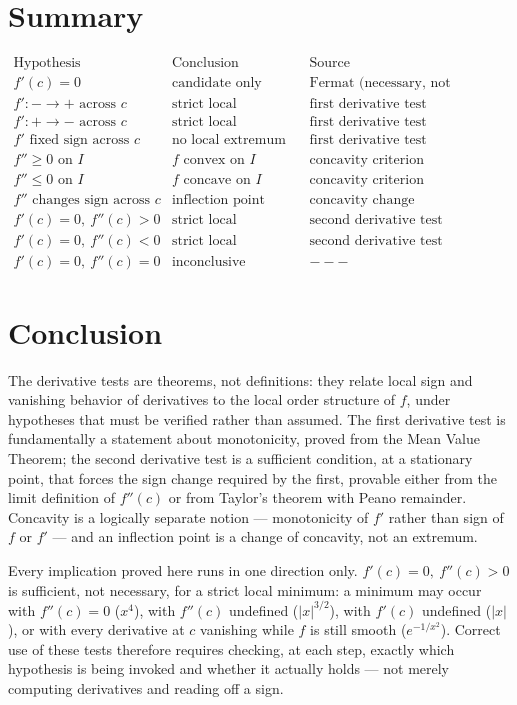 \documentclass{essay}
\begin{document}
\section{Summary}

\[
\begin{array}{c|c|c}
\text{Hypothesis} & \text{Conclusion} & \text{Source}\\
\hline
f'(c)=0 & \text{candidate only} & \text{Fermat (necessary, not sufficient)}\\[4pt]
f':-\to+ \text{ across } c & \text{strict local minimum} & \text{first derivative test}\\[4pt]
f':+\to- \text{ across } c & \text{strict local maximum} & \text{first derivative test}\\[4pt]
f' \text{ fixed sign across } c & \text{no local extremum} & \text{first derivative test}\\[4pt]
f''\geq0 \text{ on } I & f \text{ convex on } I & \text{concavity criterion}\\[4pt]
f''\leq0 \text{ on } I & f \text{ concave on } I & \text{concavity criterion}\\[4pt]
f'' \text{ changes sign across } c & \text{inflection point} & \text{concavity change}\\[4pt]
f'(c)=0,\ f''(c)>0 & \text{strict local minimum} & \text{second derivative test}\\[4pt]
f'(c)=0,\ f''(c)<0 & \text{strict local maximum} & \text{second derivative test}\\[4pt]
f'(c)=0,\ f''(c)=0 & \text{inconclusive} & ---
\end{array}
\]

\section{Conclusion}

The derivative tests are theorems, not definitions: they relate local sign
and vanishing behavior of derivatives to the local order structure of
\(f\), under hypotheses that must be verified rather than assumed. The
first derivative test is fundamentally a statement about monotonicity,
proved from the Mean Value Theorem; the second derivative test is a
sufficient condition, at a stationary point, that forces the sign change
required by the first, provable either from the limit definition of
\(f''(c)\) or from Taylor's theorem with Peano remainder. Concavity is a
logically separate notion --- monotonicity of \(f'\) rather than sign of
\(f\) or \(f'\) --- and an inflection point is a change of concavity, not
an extremum.

Every implication proved here runs in one direction only. \(f'(c)=0,\
f''(c)>0\) is sufficient, not necessary, for a strict local minimum: a
minimum may occur with \(f''(c)=0\) (\(x^4\)), with \(f''(c)\) undefined
(\(|x|^{3/2}\)), with \(f'(c)\) undefined (\(|x|\)), or with every
derivative at \(c\) vanishing while \(f\) is still smooth
(\(e^{-1/x^2}\)). Correct use of these tests therefore requires checking,
at each step, exactly which hypothesis is being invoked and whether it
actually holds --- not merely computing derivatives and reading off a sign.
\end{document}
